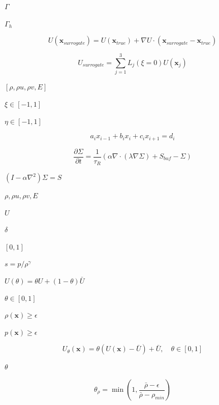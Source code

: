 \documentclass{article}
\begin{document}
$ \Gamma $
\pagebreak

$ \Gamma_h $
\pagebreak

\[U(\mathbf{x}_{surrogate}) = U(\mathbf{x}_{true}) + \nabla U \cdot (\mathbf{x}_{surrogate} - \mathbf{x}_{true})
\]
\pagebreak

\[U_{surrogate} = \sum_{j=1}^{3} L_j(\xi=0) U(\mathbf{x}_j)
\]
\pagebreak

$[\rho, \rho u, \rho v, E]$
\pagebreak

$\xi \in [-1, 1]$
\pagebreak

$\eta \in [-1, 1]$
\pagebreak

\[ a_i x_{i-1} + b_i x_i + c_i x_{i+1} = d_i \]
\pagebreak

\[ \frac{\partial \Sigma}{\partial t} = \frac{1}{\tau_R} \left( \alpha \nabla \cdot ( \lambda \nabla \Sigma ) + S_{buf} - \Sigma \right) \]
\pagebreak

$ (I - \alpha \nabla^2) \Sigma = S $
\pagebreak

$\rho, \rho u, \rho v, E$
\pagebreak

$U$
\pagebreak

$\delta$
\pagebreak

$[0, 1]$
\pagebreak

$ s = p / \rho^\gamma $
\pagebreak

$ U(\theta) = \theta U + (1-\theta) \bar{U} $
\pagebreak

$\theta \in [0,1]$
\pagebreak

$ \rho(\mathbf{x}) \ge \epsilon $
\pagebreak

$ p(\mathbf{x}) \ge \epsilon $
\pagebreak

\[U_{\theta}(\mathbf{x}) = \theta (U(\mathbf{x}) - \bar{U}) + \bar{U}, \quad \theta \in [0, 1]
\]
\pagebreak

$ \theta $
\pagebreak

\[\theta_{\rho} = \min \left( 1, \frac{\bar{\rho} - \epsilon}{\bar{\rho} - \rho_{min}} \right)
\]
\pagebreak
\end{document}
